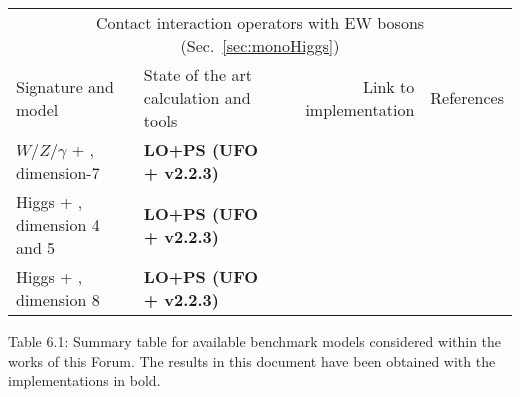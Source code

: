\begin{footnotesize}
\begin{table*}[!p]
\begin{tabular}{llrl}
	\cmidrule(r){1-4} 
	\multicolumn{4}{c}{Contact interaction operators with EW bosons (Sec.~\ref{sec:monoHiggs})}\\
	\cmidrule(r){1-4} 
	Signature and model & State of the art calculation and tools & Link to implementation & References \\ 
	\cmidrule(r){1-4} 
	
	 $W/Z/\gamma$ + \MET{}, dimension-7& \textbf{LO+PS (UFO + \madgraph v2.2.3)} & \cite{ForumSVN_EWEFTD7}& \parbox{4cm} {\cite{Cotta:2012nj, Carpenter:2012rg, Crivellin:2015wva,Berlin:2014cfa,Alwall:2014hca,Alloul:2013bka,Degrande:2011ua} }\\ 
	 Higgs + \MET{}, dimension 4 and 5 & \textbf{LO+PS (UFO + \madgraph v2.2.3)} & \cite{ForumSVN_monoHEFTD5}& \parbox{4cm} {\cite{Carpenter:2013xra,Petrov:2013nia,Berlin:2014cfa,Alwall:2014hca,Alloul:2013bka,Degrande:2011ua} }\\ 
	 Higgs + \MET{}, dimension 8 & \textbf{LO+PS (UFO + \madgraph v2.2.3)} & \cite{ForumSVN_EWMonoHiggs}&
	 \parbox{4cm} {\cite{Carpenter:2013xra,Petrov:2013nia,Berlin:2014cfa,Alwall:2014hca,Alloul:2013bka,Degrande:2011ua} }\\ 

	
	\bottomrule 
	\end{tabular}
	
	\begin{center}
		\normalsize 
		Table 6.1: 
		Summary table for available benchmark models considered within the works of this Forum. 
		The results in this document have been obtained with the implementations in bold. 	
		\label{tab:summaryModels}
	\end{center}
	
\end{table*}

\end{footnotesize}


